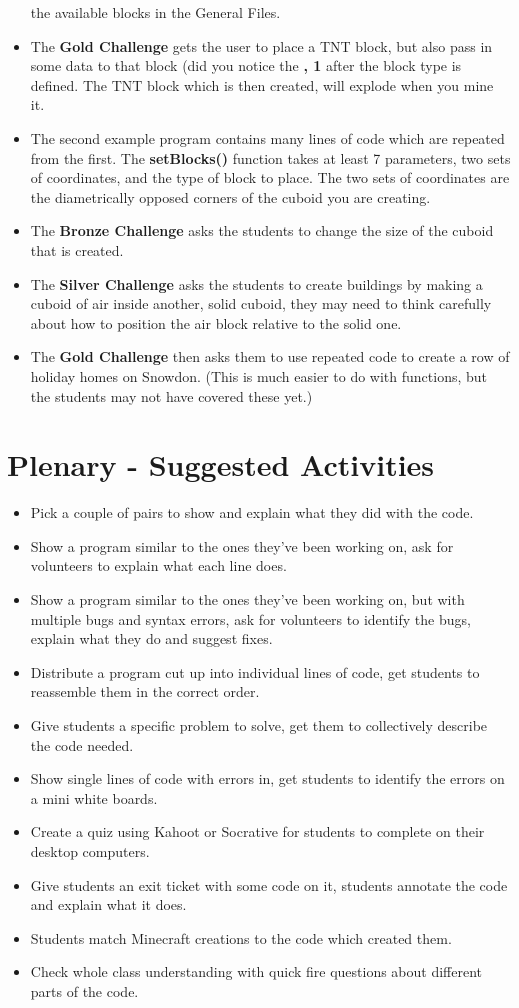 \documentclass{geocraft-lesson-plan}
\begin{document}
\begin{itemize}
  the available blocks in the General Files.
\item The \textbf{Gold Challenge} gets the user to place a TNT block, but also pass in some data to that block (did you
  notice the \textbf{, 1} after the block type is defined. The TNT block which is then created, will explode when you
  mine it.
\item The second example program contains many lines of code which are repeated from the first. The \textbf{setBlocks()}
  function takes at least 7 parameters, two sets of coordinates, and the type of block to place. The two sets of
  coordinates are the diametrically opposed corners of the cuboid you are creating.
\item The \textbf{Bronze Challenge} asks the students to change the size of the cuboid that is created.
\item The \textbf{Silver Challenge} asks the students to create buildings by making a cuboid of air inside another,
  solid cuboid, they may need to think carefully about how to position the air block relative to the solid one.
\item The \textbf{Gold Challenge} then asks them to use repeated code to create a row of holiday homes on Snowdon. (This
  is much easier to do with functions, but the students may not have covered these yet.)
\end{itemize}

\section*{Plenary - Suggested Activities}
\begin{itemize}
\item Pick a couple of pairs to show and explain what they did with the code. 
\item Show a program similar to the ones they've been working on, ask for volunteers to explain what each line does.
\item Show a program similar to the ones they've been working on, but with multiple bugs and syntax errors, ask for
  volunteers to identify the bugs, explain what they do and suggest fixes.
\item Distribute a program cut up into individual lines of code, get students to reassemble them in the correct order.
\item Give students a specific problem to solve, get them to collectively describe the code needed.
\item Show single lines of code with errors in, get students to identify the errors on a mini white boards.
\item Create a quiz using Kahoot or Socrative for students to complete on their desktop computers.
\item Give students an exit ticket with some code on it, students annotate the code and explain what it does.
\item Students match Minecraft creations to the code which created them.
\item Check whole class understanding with quick fire questions about different parts of the code. 
\end{itemize}
\end{document}
